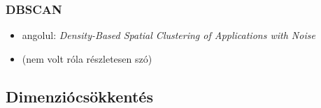 \documentclass[a4paper, 11pt]{article}
\newcommand\norm[1]{\left\Vert#1\right\Vert}
\begin{document}
\iffalse
\begin{footnotesize}
	\setlength{\stmheight}{14pt}
	\begin{stuki*}{KMeans$(x : R^p[N], K : \mathbb{N}^+) : \mathbb{B}[K \cdot N] \times R^p[K]$}
		\stm{V := \textbf{ new } R^p[K]; ~~ U := \textbf{ new } \mathbb{B}[K \cdot N]}
		\stm{t_{max} := 0; ~~ converged := false}
		\begin{WHILE}{1}{\stm{i := 1 \textbf{ to } K}}
			\stm{V[i] := \text{random}_p()}
		\end{WHILE}
		\begin{WHILE}{5}{\stm{t \leq t_{max} \land \neg converged }}
			\begin{WHILE}{3}{\stm{k := 1 \textbf{ to } N}}
				\stm{\forall i \in [1..K] : U[i, k] := \norm{x[k] - V[i]}}
			\end{WHILE}
			\stm{t := t + 1}
		\end{WHILE}
		\stm{\textbf{return } (U, V)}
	\end{stuki*}
\end{footnotesize}
\fi

\newpage

\subsubsection{DBSCAN}

\begin{itemize}
	\item angolul: \textit{Density-Based Spatial Clustering of Applications with Noise}
	\item (nem volt róla részletesen szó)
\end{itemize}

\subsection{Dimenziócsökkentés}
	
\end{document}
